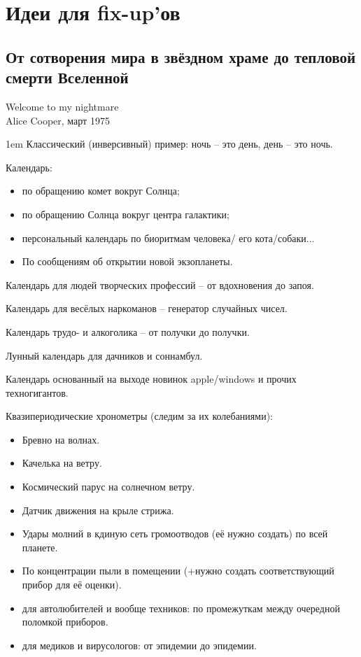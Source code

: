 \section{Идеи для fix-up'ов} %
\subsection{От сотворения мира в звёздном храме до тепловой смерти Вселенной}
\begin{epigraph}
    Welcome to my nightmare\\
    {\normalfont Alice Cooper, март 1975}
\end{epigraph}
\begin{flushleft}\parskip1em
    Классический (инверсивный) пример: ночь -- это день, день -- это ночь.

    Календарь:
    \begin{itemize}
        \item по обращению комет вокруг Солнца;
        \item по обращению Солнца вокруг центра галактики;
        \item персональный календарь по биоритмам человека/ его кота/собаки...
        \item По сообщениям об открытии новой экзопланеты.
    \end{itemize}

    Календарь для людей творческих профессий -- от вдохновения до запоя.

    Календарь для весёлых наркоманов -- генератор случайных чисел.

    Календарь трудо- и алкоголика -- от получки до получки.

    Лунный календарь для дачников и соннамбул.

    Календарь основанный на выходе новинок apple/windows и прочих техногигантов.

    Квазипериодические хронометры (следим за их колебаниями):
    \begin{itemize}
        \item Бревно на волнах.
        \item Качелька на ветру.
        \item Космический парус на солнечном ветру.
        \item Датчик движения на крыле стрижа.
        \item Удары молний в кдиную сеть громоотводов (её нужно создать) по всей планете.
        \item По концентрации пыли в помещении (+нужно создать соответствующий прибор для её оценки).
        \item для автолюбителей и вообще техников: по промежуткам между очередной поломкой приборов.
        \item для медиков и вирусологов: от эпидемии до эпидемии.
    \end{itemize}


\end{flushleft}
